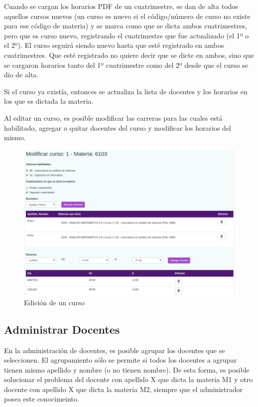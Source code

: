 \documentclass[a4paper]{article}
\begin{document}
Cuando se cargan los horarios PDF de un cuatrimestre, se dan de alta todos aquellos cursos nuevos (un curso es nuevo si el código/número de curso no existe para ese código de materia) y se marca como que se dicta ambos cuatrimestres, pero que es curso nuevo, registrando el cuatrimestre que fue actualizado (el 1º o el 2º). El curso seguirá siendo nuevo hasta que esté registrado en ambos cuatrimestres. Que esté registrado no quiere decir que se dicte en ambos, sino que se cargaron horarios tanto del 1º cuatrimestre como del 2º desde que el curso se dio de alta.

Si el curso ya existía, entonces se actualiza la lista de docentes y los horarios en los que es dictada la materia.

Al editar un curso, es posible modificar las carreras para las cuales está habilitado, agregar o quitar docentes del curso y modificar los horarios del mismo.

\begin{figure}[H]
\centering
\includegraphics[scale=0.35]{Imagenes/modificar_curso.png}\par
\caption{Edición de un curso}
\end{figure}

\subsection{Administrar Docentes}

En la administración de docentes, es posible agrupar los docentes que se seleccionen. El agrupamiento sólo se permite si todos los docentes a agrupar tienen mismo apellido y nombre (o no tienen nombre). De esta forma, es posible solucionar el problema del docente con apellido X que dicta la materia M1 y otro docente con apellido X que dicta la materia M2, siempre que el administrador posea este conocimeinto.
\end{document}
